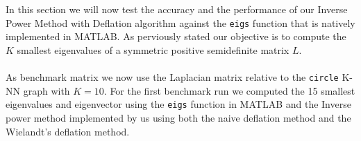 In this section we will now test the accuracy and the performance of our Inverse Power Method with Deflation algorithm against the \texttt{eigs} function that is natively implemented in MATLAB. As perviously stated our objective is to compute the \(K\) smallest eigenvalues of a symmetric positive semidefinite matrix \(L\).
\\
\\
As benchmark matrix we now use the Laplacian matrix relative to the \texttt{circle} K-NN graph with \(K=10\). For the first benchmark run we computed the 15 smallest eigenvalues and eigenvector using the \texttt{eigs} function in MATLAB and the Inverse power method implemented by us using both the naive deflation method and the Wielandt's deflation method.
\begin{figure}[H]
    \centering

\end{figure}
